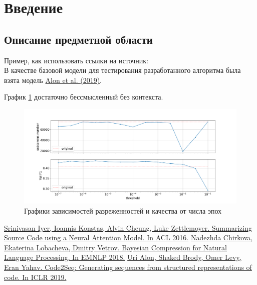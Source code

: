 \documentclass[a4paper,14pt]{extarticle}
\newcommand{\bibref}[3]{\hyperlink{#1}{#2 (#3)}} %
\begin{document}
\newpage

{
	\hypersetup{linkcolor=black}
	\tableofcontents
}

\newpage

\section{Введение} 
\subsection{Описание предметной области}

Пример, как использовать ссылки на источник:\\
В качестве базовой модели для тестирования разработанного алгоритма была взята модель \bibref{code2seq}{Alon et al.}{2019}.

График \ref{fig:by_epochs} достаточно бессмысленный без контекста.

\begin{figure}[h!]
	\centering
	\includegraphics[width=1\textwidth]{graphics/example.png}
	\caption{Графики зависимостей разреженностей и качества от числа эпох }
	\label{fig:by_epochs}
\end{figure}



\begin{thebibliography}{0}
\hypertarget{codenn}{}
\href{https://www.aclweb.org/anthology/P16-1195.pdf}
{Srinivasan Iyer, Ioannis Konstas, Alvin Cheung, Luke Zettlemoyer. Summarizing Source Code using a Neural Attention Model. In ACL 2016.}
\hypertarget{chirkova18}{}
\href{https://arxiv.org/abs/1810.10927}
{Nadezhda Chirkova, Ekaterina Lobacheva, Dmitry Vetrov. Bayesian Compression for Natural Language Processing. In EMNLP 2018.}
\hypertarget{code2seq}{}
\href{https://openreview.net/pdf?id=H1gKYo09tX}
{Uri Alon, Shaked Brody, Omer Levy, Eran Yahav. Code2Seq: Generating sequences from structured representations of code. In ICLR 2019.}
\end{thebibliography}
\end{document}
